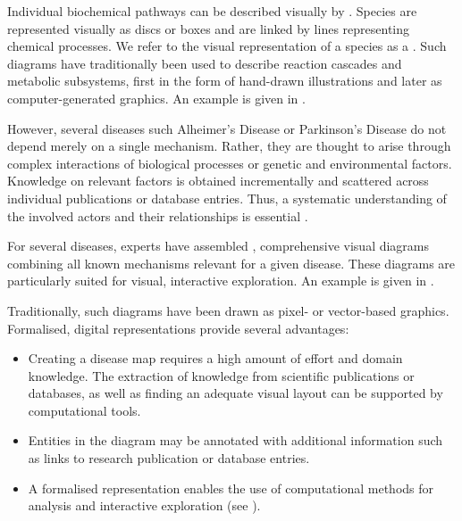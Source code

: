 \documentclass[
	fontsize=10pt, %
	twoside=false, %
	secnumdepth=1, %
  toc=indentunnumbered %
]{kaobook}
\begin{document}
Individual biochemical pathways can be described visually by . Species are represented visually as discs or boxes and
are linked by lines representing chemical processes.
We refer to the visual representation of a species as a .
Such diagrams have traditionally been
used to describe reaction cascades and metabolic subsystems, first in the form
of hand-drawn illustrations and later as computer-generated graphics.
An example is given in
. 

However, several diseases such Alheimer's Disease or Parkinson's Disease do not depend
merely on a single mechanism. Rather, they are thought to arise through complex
interactions of biological processes or genetic and environmental factors.
Knowledge on relevant factors is obtained incrementally and scattered across
individual publications or database entries.
Thus, a systematic understanding of the involved actors and their
relationships is essential
\cite{ostaszewski_CommunitydrivenRoadmapIntegrated_2019,
  mazein_SystemsMedicineDisease_2018}.
% 

For several diseases, experts have assembled
, comprehensive visual diagrams combining all known mechanisms
relevant for a given disease.
These diagrams are particularly suited for visual, interactive exploration.
An example is given in
.

Traditionally, such diagrams have been drawn as pixel- or vector-based graphics.
Formalised, digital representations provide several advantages:
\begin{itemize}
  \item Creating a disease map requires a high amount of effort and domain
    knowledge. The extraction of knowledge from scientific publications or
    databases, as well as finding an adequate visual layout can be supported by
    computational tools.
\item Entities in the diagram may be annotated with additional information
  such as links to research publication or database entries.
\item A formalised representation enables the use of computational methods for
  analysis and interactive exploration (see ).
\end{itemize}
\end{document}
